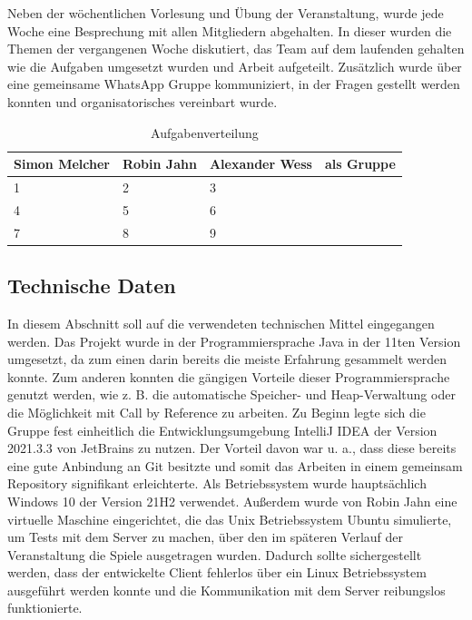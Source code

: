 \documentclass[12pt,a4paper,bibliography=totocnumbered,listof=totocnumbered]{article}
\begin{document}
Neben der wöchentlichen Vorlesung und Übung der Veranstaltung, wurde jede Woche eine Besprechung mit allen Mitgliedern abgehalten. In dieser wurden die Themen der vergangenen Woche diskutiert, das Team auf dem laufenden gehalten wie die Aufgaben umgesetzt wurden und Arbeit aufgeteilt. Zusätzlich wurde über eine gemeinsame WhatsApp Gruppe kommuniziert, in der Fragen gestellt werden konnten und organisatorisches vereinbart wurde.


\vspace{1em}
\begin{table}[!h]
	\centering
	\begin{tabular}{|l|l|l|l|}
		\hline
		\textbf{Simon Melcher} & \textbf{Robin Jahn} & \textbf{Alexander Wess} & \textbf{als Gruppe}\\
		\hline
		1 & 2 & 3\\
		\hline
		4 & 5 & 6\\
		\hline
		7 & 8 & 9\\
		\hline
	\end{tabular}
	\caption{Aufgabenverteilung}
	\label{tab:tasks}
\end{table}

\subsection{Technische Daten}
In diesem Abschnitt soll auf die verwendeten technischen Mittel eingegangen werden. Das Projekt wurde in der Programmiersprache Java in der 11ten Version umgesetzt, da zum einen darin bereits die meiste Erfahrung gesammelt werden konnte. Zum anderen konnten die gängigen Vorteile dieser Programmiersprache genutzt werden, wie z. B. die automatische Speicher- und Heap-Verwaltung oder die Möglichkeit mit \glqq Call by Reference\grqq{} zu arbeiten.
Zu Beginn legte sich die Gruppe fest einheitlich die Entwicklungsumgebung IntelliJ IDEA der Version 2021.3.3 von JetBrains zu nutzen. Der Vorteil davon war u. a., dass diese bereits eine gute Anbindung an Git besitzte und somit das Arbeiten in einem gemeinsam Repository signifikant erleichterte.
Als Betriebssystem wurde hauptsächlich Windows 10 der Version 21H2 verwendet. Außerdem wurde von Robin Jahn eine virtuelle Maschine eingerichtet, die das Unix Betriebssystem Ubuntu simulierte, um Tests mit dem Server zu machen, über den im späteren Verlauf der Veranstaltung die Spiele ausgetragen wurden. Dadurch sollte sichergestellt werden, dass der entwickelte Client fehlerlos über ein Linux Betriebssystem ausgeführt werden konnte und die Kommunikation mit dem Server reibungslos funktionierte.
\end{document}
